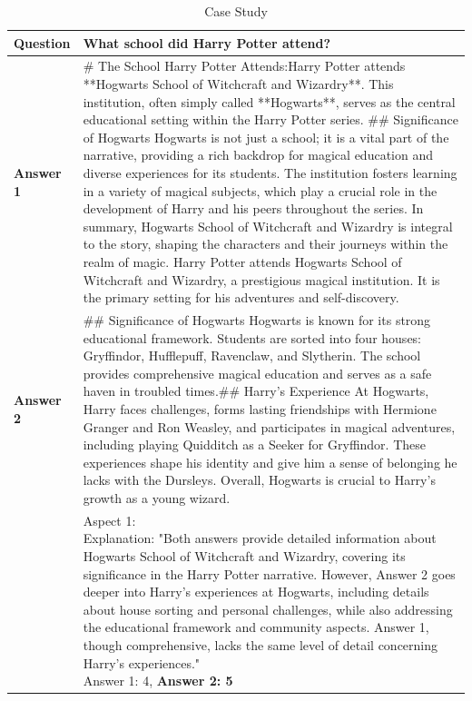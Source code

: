 \renewcommand{\arraystretch}{2}
\begin{table}
  \caption{Case Study}
  \label{tab: casestudy}
\begin{tabular}{|p{}|p{}|}
\hline
\textbf{Question} & \textbf{What school did Harry Potter attend?} \\
\hline
\textbf{Answer 1} & \# The School Harry Potter Attends:Harry Potter attends **Hogwarts School of Witchcraft and Wizardry**. This institution, often simply called **Hogwarts**, serves as the central educational setting within the Harry Potter series. \#\# Significance of Hogwarts Hogwarts is not just a school; it is a vital part of the narrative, providing a rich backdrop for magical education and diverse experiences for its students. The institution fosters learning in a variety of magical subjects, which play a crucial role in the development of Harry and his peers throughout the series. In summary, Hogwarts School of Witchcraft and Wizardry is integral to the story, shaping the characters and their journeys within the realm of magic. Harry Potter attends Hogwarts School of Witchcraft and Wizardry, a prestigious magical institution. It is the primary setting for his adventures and self-discovery. \\
\hline
\textbf{Answer 2} & \#\# Significance of Hogwarts Hogwarts is known for its strong educational framework. Students are sorted into four houses: Gryffindor, Hufflepuff, Ravenclaw, and Slytherin. The school provides comprehensive magical education and serves as a safe haven in troubled times.\#\# Harry's Experience At Hogwarts, Harry faces challenges, forms lasting friendships with Hermione Granger and Ron Weasley, and participates in magical adventures, including playing Quidditch as a Seeker for Gryffindor. These experiences shape his identity and give him a sense of belonging he lacks with the Dursleys. Overall, Hogwarts is crucial to Harry's growth as a young wizard. \\
\hline
\textbf{\parbox{0.1\textwidth}{Random \\ Select Judge}} & 
\parbox{0.85\textwidth}{
\vspace{0.3cm} 
Aspect 1:\\
Explanation: "Both answers provide detailed information about Hogwarts School of Witchcraft and Wizardry, covering its significance in the Harry Potter narrative. However, Answer 2 goes deeper into Harry's experiences at Hogwarts, including details about house sorting and personal challenges, while also addressing the educational framework and community aspects. Answer 1, though comprehensive, lacks the same level of detail concerning Harry's experiences." \\ Answer 1: 4, \textbf{Answer 2: 5}} \\


\end{tabular}
\end{table}
